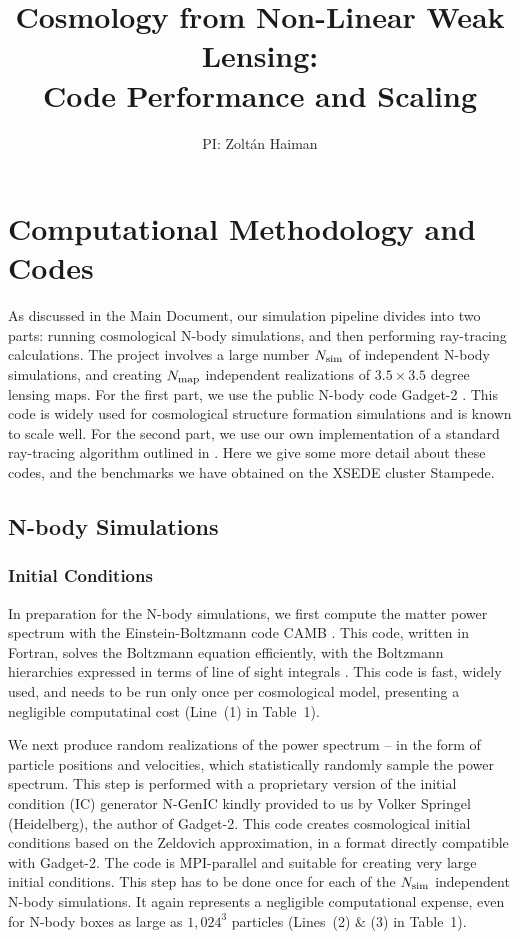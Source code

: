 \documentclass[10pt, preprint]{aastex}
\begin{document}


\title{Cosmology from Non-Linear Weak Lensing:\\Code Performance and Scaling}

\author{PI: Zolt\'an Haiman}


\section{Computational Methodology and Codes} \label{sec:methods}

As discussed in the Main Document, our simulation pipeline divides
into two parts: running cosmological N-body simulations, and then
performing ray-tracing calculations.  The project involves a large
number $N_{\rm sim}$ of independent N-body simulations, and creating
$N_{\rm map}$ independent realizations of $3.5\times3.5$ degree
lensing maps.  For the first part, we use the public N-body code
Gadget-2 \citep{VS05}.  This code is widely used for cosmological
structure formation simulations and is known to scale well.  For the
second part, we use our own implementation of a standard ray-tracing
algorithm outlined in \citet{H&M01}.  Here we give some more detail
about these codes, and the benchmarks we have obtained on the XSEDE
cluster Stampede.

\subsection{N-body Simulations}

\subsubsection{Initial Conditions}

In preparation for the N-body simulations, we first compute the matter
power spectrum with the Einstein-Boltzmann code CAMB \citep{CAMB}.
This code, written in Fortran, solves the Boltzmann equation
efficiently, with the Boltzmann hierarchies expressed in terms of line
of sight integrals \citep{CMBFAST}.    This code is fast, widely used,
and needs to be run only once per cosmological model, presenting a negligible
computatinal cost (Line~(1) in Table~1).

We next produce random realizations of the power spectrum -- in the
form of particle positions and velocities, which statistically
randomly sample the power spectrum.  This step is performed with a
proprietary version of the initial condition (IC) generator N-GenIC
kindly provided to us by Volker Springel (Heidelberg), the author of
Gadget-2.  This code creates cosmological initial conditions based on
the Zeldovich approximation, in a format directly compatible with
Gadget-2.  The code is MPI-parallel and suitable for creating very
large initial conditions.  This step has to be done once for each of
the $N_{\rm sim}$ independent N-body simulations. It again represents
a negligible computational expense, even for N-body boxes as large as
$1,024^3$ particles (Lines~(2) $\&$ (3) in Table~1).
\end{document}
